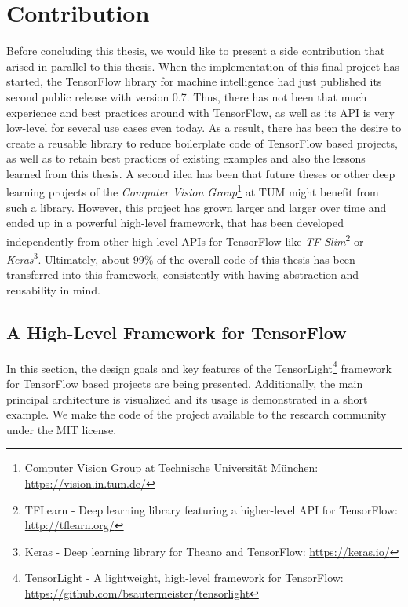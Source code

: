 
\chapter{Contribution} \label{chapter:contribution}

Before concluding this thesis, we would like to present a side contribution that arised in parallel to this thesis. When the implementation of this final project has started, the TensorFlow library for machine intelligence had just published its second public release with version \num{0.7}. Thus, there has not been that much experience and best practices around with TensorFlow, as well as its API is very low-level for several use cases even today. As a result, there has been the desire to create a reusable library to reduce boilerplate code of TensorFlow based projects, as well as to retain best practices of existing examples and also the lessons learned from this thesis. A second idea has been that future theses or other deep learning projects of the \textit{Computer Vision Group}\footnote{Computer Vision Group at Technische Universität München: \url{https://vision.in.tum.de/}} at TUM might benefit from such a library. However, this project has grown larger and larger over time and ended up in a powerful high-level framework, that has been developed independently from other high-level APIs for TensorFlow like \textit{TF-Slim}\footnote{TFLearn - Deep learning library featuring a higher-level API for TensorFlow: \url{http://tflearn.org/}} or \textit{Keras}\footnote{Keras - Deep learning library for Theano and TensorFlow: \url{https://keras.io/}}. Ultimately, about $ 99\% $ of the overall code of this thesis has been transferred into this framework, consistently with having abstraction and reusability in mind.

\section{A High-Level Framework for TensorFlow}

In this section, the design goals and key features of the TensorLight\footnote{TensorLight - A lightweight, high-level framework for TensorFlow:\\ \url{https://github.com/bsautermeister/tensorlight}} framework for TensorFlow based projects are being presented. Additionally, the main principal architecture is visualized and its usage is demonstrated in a short example. We make the code of the project available to the research community under the MIT license.


